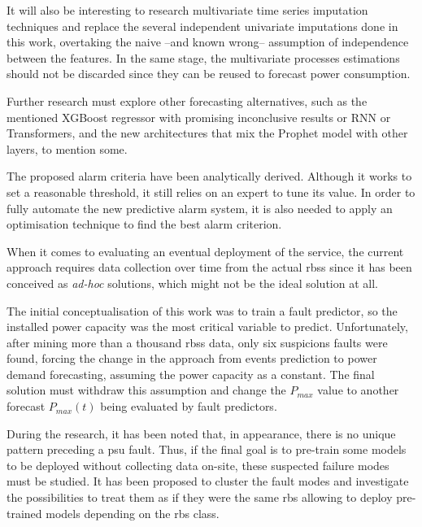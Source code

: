 It will also be interesting to research multivariate time series imputation techniques and replace the several independent univariate imputations done in this work, overtaking the naive --and known wrong-- assumption of independence between the features. In the same stage, the multivariate processes estimations should not be discarded since they can be reused to forecast power consumption.

Further research must explore other forecasting alternatives, such as the mentioned XGBoost regressor with promising inconclusive results or RNN or Transformers,  and the new architectures that mix the Prophet model with other layers, to mention some. 

The proposed alarm criteria have been analytically derived. Although it works to set a reasonable threshold, it still relies on an expert to tune its value. In order to fully automate the new predictive alarm system, it is also needed to apply an optimisation technique to find the best alarm criterion. 

When it comes to evaluating an eventual deployment of the service, the current approach requires data collection over time from the actual \acp{rbs} since it has been conceived as \textit{ad-hoc} solutions, which might not be the ideal solution at all. 

The initial conceptualisation of this work was to train a fault predictor, so the installed power capacity was the most critical variable to predict. Unfortunately, after mining more than a thousand \acp{rbs} data, only six suspicions faults were found, forcing the change in the approach from events prediction to power demand forecasting, assuming the power capacity as a constant. The final solution must withdraw this assumption and change the $P_{max}$ value to another forecast $P_{max}(t)$ being evaluated by fault predictors. 

During the research, it has been noted that, in appearance, there is no unique pattern preceding a \ac{psu} fault. Thus, if the final goal is to pre-train some models to be deployed without collecting data on-site, these suspected failure modes must be studied. It has been proposed to cluster the fault modes and investigate the possibilities to treat them as if they were the same \ac{rbs} allowing to deploy pre-trained models depending on the \ac{rbs} class.


